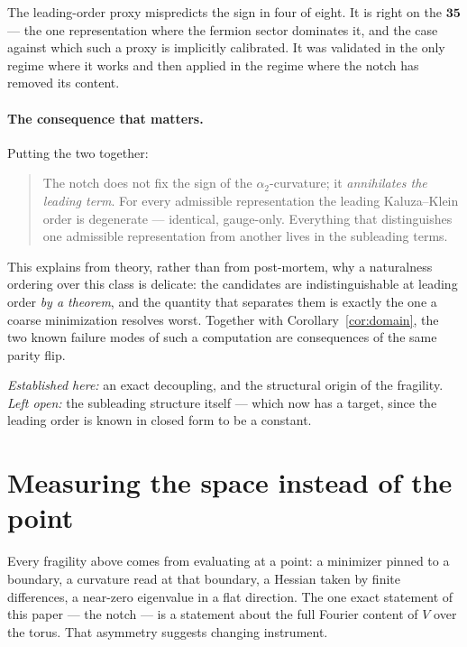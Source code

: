 \documentclass[11pt,a4paper]{article}
\begin{document}
The leading-order proxy mispredicts the sign in four of eight. It is right on the
$\mathbf{35}$ --- the one representation where the fermion sector dominates it, and the case
against which such a proxy is implicitly calibrated. It was validated in the only regime
where it works and then applied in the regime where the notch has removed its content.

\paragraph{The consequence that matters.} Putting the two together:

\begin{quote}
The notch does not fix the sign of the $\alpha_2$-curvature; it \emph{annihilates the
leading term}. For every admissible representation the leading Kaluza--Klein order is
degenerate --- identical, gauge-only. Everything that distinguishes one admissible
representation from another lives in the subleading terms.
\end{quote}

This explains from theory, rather than from post-mortem, why a naturalness ordering over this
class is delicate: the candidates are indistinguishable at leading order \emph{by a
theorem}, and the quantity that separates them is exactly the one a coarse minimization
resolves worst. Together with Corollary~\ref{cor:domain}, the two known failure modes of such
a computation are consequences of the same parity flip.

\emph{Established here:} an exact decoupling, and the structural origin of the fragility.
\emph{Left open:} the subleading structure itself --- which now has a target, since the
leading order is known in closed form to be a constant.

\section{Measuring the space instead of the point}\label{sec:basin}
Every fragility above comes from evaluating at a point: a minimizer pinned to a boundary, a
curvature read at that boundary, a Hessian taken by finite differences, a near-zero
eigenvalue in a flat direction. The one exact statement of this paper --- the notch --- is a
statement about the full Fourier content of $V$ over the torus. That asymmetry suggests
changing instrument.
\end{document}
